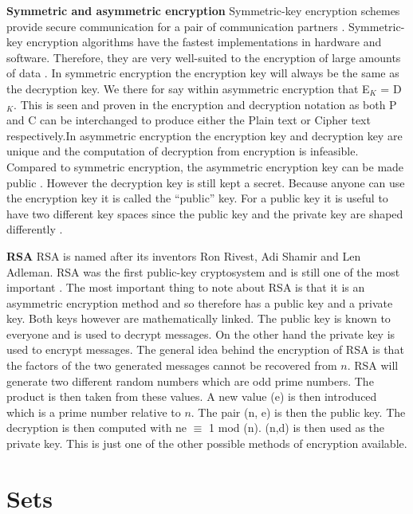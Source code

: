 \documentclass[11pt,a4paper]{report}
\begin{document}
\textbf{Symmetric and asymmetric encryption}\newline
Symmetric-key encryption schemes provide secure communication for a pair of communication partners \cite{DBLP:series/isc/DelfsK07}. Symmetric-key encryption algorithms have the fastest implementations in hardware and software. Therefore, they are very well-suited to the encryption of large amounts of data \cite{DBLP:series/isc/DelfsK07}. In symmetric encryption the encryption key will always be the same as the decryption key. We there for say within asymmetric encryption that E$_{K}$ = D$_{K}$. This is seen and proven in the encryption and decryption notation as both P and C can be interchanged to produce either the Plain text or Cipher text respectively.In asymmetric encryption the encryption key and decryption key are unique and the computation of decryption from encryption is infeasible. Compared to symmetric encryption, the asymmetric encryption key can be made public \cite{DBLP:series/isc/DelfsK07}. However the decryption key is still kept a secret. Because anyone can use the encryption key it is called the “public” key. For a public key it is useful to have two different key spaces since the public key and the private key are shaped differently \cite{DBLP:series/isc/DelfsK07}.

\textbf{RSA}\newline
RSA is named after its inventors Ron Rivest, Adi Shamir and Len Adleman. RSA was the first public-key cryptosystem and is still one of the most important \cite{DBLP:series/isc/DelfsK07}. The most important thing to note about RSA is that it is an asymmetric encryption method and so therefore has a public key and a private key. Both keys however are mathematically linked. The public key is known to everyone and is used to decrypt messages. On the other hand the private key is used to encrypt messages. The general idea behind the encryption of RSA is that the factors of the two generated messages cannot be recovered from $n$. RSA will generate two different random numbers which are odd prime numbers. The product is then taken from these values. A new value (e) is then introduced which is a prime number relative to $n$. The pair (n, e) is then the public key. The decryption is then computed with ne $\equiv$ 1 mod (n). (n,d) is then used as the private key. This is just one of the other possible methods of encryption available.


\section{Sets}
\label{sec:sets}
\end{document}
